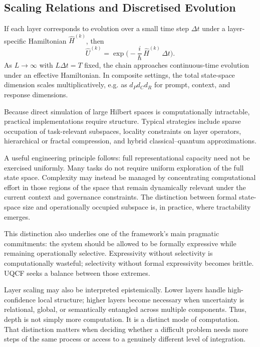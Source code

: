 \documentclass[12pt]{article}
\begin{document}
\subsection{Scaling Relations and Discretised Evolution}
If each layer corresponds to evolution over a small time step $\Delta t$ under a layer-specific Hamiltonian $\hat{H}^{(k)}$, then
\begin{equation}
\hat{U}^{(k)} = \exp\!\Big(-\frac{i}{\hbar}\,\hat{H}^{(k)}\,\Delta t\Big).
\end{equation}
As $L \to \infty$ with $L\Delta t = T$ fixed, the chain approaches continuous-time evolution under an effective Hamiltonian. In composite settings, the total state-space dimension scales multiplicatively, e.g. as $d_P d_C d_R$ for prompt, context, and response dimensions.

Because direct simulation of large Hilbert spaces is computationally intractable, practical implementations require structure. Typical strategies include sparse occupation of task-relevant subspaces, locality constraints on layer operators, hierarchical or fractal compression, and hybrid classical--quantum approximations.

A useful engineering principle follows: full representational capacity need not be exercised uniformly. Many tasks do not require uniform exploration of the full state space. Complexity may instead be managed by concentrating computational effort in those regions of the space that remain dynamically relevant under the current context and governance constraints. The distinction between formal state-space size and operationally occupied subspace is, in practice, where tractability emerges.

This distinction also underlies one of the framework's main pragmatic commitments: the system should be allowed to be formally expressive while remaining operationally selective. Expressivity without selectivity is computationally wasteful; selectivity without formal expressivity becomes brittle. UQCF seeks a balance between those extremes.

Layer scaling may also be interpreted epistemically. Lower layers handle high-confidence local structure; higher layers become necessary when uncertainty is relational, global, or semantically entangled across multiple components. Thus, depth is not simply more computation. It is a distinct mode of computation. That distinction matters when deciding whether a difficult problem needs more steps of the same process or access to a genuinely different level of integration.
\end{document}
